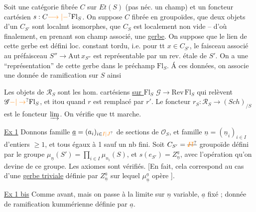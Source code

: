 Soit une catégorie fibrée  $C$ sur $Et(S)$ (pas néc. un champ) et un foncteur cartésien $s:C\unsure{\longrightarrow|-}\mathrm{Fl}_S$. On suppose $C$ fibrée en groupoïdes, que deux objets d'un $C_{S'}$ sont localmt isomorphes, que $C_S$ est localement non vide -- d'où finalement, en prenant son champ associé, une \uline{gerbe}. On suppose que le lien de cette gerbe est défini  loc. constant tordu, i.e. pour tt $x\in C_{S'}$, le faisceau associé
au préfaisceau $S''\longrightarrow\mathrm{Aut}\,x_{S''}$ est représentable par un  rev. étale de $S'$. On a une ``représentation'' de cette gerbe dans le préchamp $\mathrm{Fl}_S$. Á ces  données, on associe une donnée de ramification sur $S$ ainsi

Les objets de $\mathscr R_S$ sont les hom. cartésiens \uline{sur $\mathrm{Fl}_S$} $\mathscr G\longrightarrow\mathrm{Rev}\,\mathrm{Fl}_S$ qui relèvent $\mathscr G\unsure{-|\to}\mathrm{Fl}_S$, et itou quand $r$ est remplacé par $r'$.
Le foncteur $r_S:\mathscr R_S\longrightarrow (Sch)_{/S}$ est le foncteur $\varinjlim$. On vérifie que tt marche.

\uline{Ex 1} Donnons  famille $\underline a=(a_i)_{i\in\unsure{I|J}}$ de sections de $\mathcal O_S$, et famille $\underline n=(\underline n_i)_{i\in I}$ d'entiers $\geq1$,   et tous égaux à 1 sauf un nb fini.  Soit $C_{S'}=\deleted{\unsure{F\!l}}$ groupoïde défini par le groupe $\mu_{\underline n}(S')=\prod_{i\in I}\mu_{n_i}(S)$,  et $s(e_{S'})=Z_{\underline n}^{\underline a}$, avec l'opération qu'on devine de ce groupe. Les axiomes sont vérifiés. [En fait, cela correspond au cas d'une \uline{gerbe triviale} définie par $Z_{\underline n}^{\underline a}$ sur lequel $\mu_{\underline n}^{\underline a}$ opère ].

\uline{Ex 1 bis}  Comme avant, mais on passe à la limite sur $\underline n$ variable, $\underline a$ fixé ; donnée de ramification kummérienne définie par $\underline a$.

